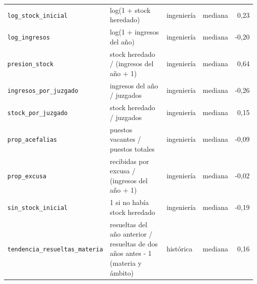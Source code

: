\begin{tabular}{lp{5.2cm}llr}
\texttt{log\_stock\_inicial} & log(1 + stock heredado) & ingeniería & mediana & 0,23 \\
\texttt{log\_ingresos} & log(1 + ingresos del año) & ingeniería & mediana & -0,20 \\
\texttt{presion\_stock} & stock heredado / (ingresos del año + 1) & ingeniería & mediana & 0,64 \\
\texttt{ingresos\_por\_juzgado} & ingresos del año / juzgados & ingeniería & mediana & -0,26 \\
\texttt{stock\_por\_juzgado} & stock heredado / juzgados & ingeniería & mediana & 0,15 \\
\texttt{prop\_acefalias} & puestos vacantes / puestos totales & ingeniería & mediana & -0,09 \\
\texttt{prop\_excusa} & recibidas por excusa / (ingresos del año + 1) & ingeniería & mediana & -0,02 \\
\texttt{sin\_stock\_inicial} & 1 si no había stock heredado & ingeniería & mediana & -0,19 \\
\texttt{tendencia\_resueltas\_materia} & resueltas del año anterior / resueltas de dos años antes - 1 (materia y ámbito) & histórica & mediana & 0,16 \\
\bottomrule
\end{tabular}
